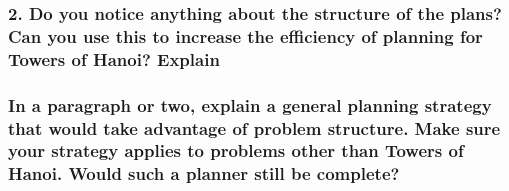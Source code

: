 \documentclass[10pt, letter]{article}
\begin{document}
\subsubsection*{2. Do you notice anything about the structure of the plans? Can you use this to increase the
efficiency of planning for Towers of Hanoi? Explain}
\subsubsection*{In a paragraph or two, explain a general planning strategy that would take advantage of
problem structure. Make sure your strategy applies to problems other than Towers of Hanoi.
Would such a planner still be complete?}




\end{document}
